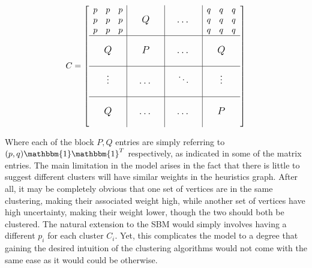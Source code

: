 \documentclass{article}
\begin{document}
\[
\sbox0{$\begin{matrix}p&p&p\\p&p&p\\p&p&p\end{matrix}$}
\sbox1{$\begin{matrix}q&q&q\\q&q&q\\q&q&q\end{matrix}$}
%
C=\left[
\begin{array}{c|c|c|c}
\usebox{0}&\makebox[\wd0]{\large $Q$}&\makebox[\wd0]{\large $\dots$}&\usebox{1}\\
\hline
\vphantom{\usebox{0}}\makebox[\wd0]{\large $Q$}&\makebox[\wd0]{\large $P$}&\makebox[\wd0]{\large $\dots$}&\makebox[\wd0]{\large $Q$}\\
\hline
\vphantom{\usebox{0}}\makebox[\wd0]{\large $\vdots$}&\makebox[\wd0]{\large $\dots$}&\makebox[\wd0]{\large $\ddots$}&\makebox[\wd0]{\large $\vdots$}\\
\hline
\vphantom{\usebox{0}}\makebox[\wd0]{\large $Q$}&\makebox[\wd0]{\large $\dots$}&\makebox[\wd0]{\large $\dots$}&\makebox[\wd0]{\large $P$}\\
\end{array}
\right]
\]

Where each of the block $P,Q$ entries are simply referring to $(p,q)\mathbbm{1}\mathbbm{1}^T$ respectively, as indicated in some of the matrix entries. The main limitation in the model arises in the fact that there is little to suggest different clusters will have similar weights in the heuristics graph. After all, it may be completely obvious that one set of vertices are in the same clustering, making their associated weight high, while another set of vertices have high uncertainty, making their weight lower, though the two should both be clustered. The natural extension to the SBM would simply involves having a different $p_i$ for each cluster $C_i$. Yet, this complicates the model to a degree that gaining the desired intuition of the clustering algorithms would not come with the same ease as it would could be otherwise. 
\end{document}
